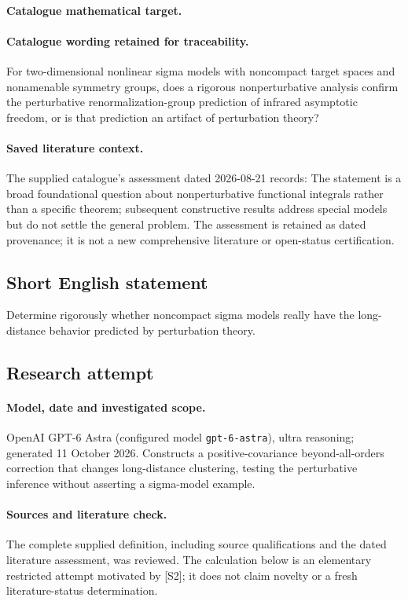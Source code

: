 \documentclass[11pt]{article}
\begin{document}
\paragraph{Catalogue mathematical target.}
\paragraph{Catalogue wording retained for traceability.}
For two-dimensional nonlinear sigma models with noncompact target spaces and nonamenable symmetry groups, does a rigorous nonperturbative analysis confirm the perturbative renormalization-group prediction of infrared asymptotic freedom, or is that prediction an artifact of perturbation theory?

\paragraph{Saved literature context.} The supplied catalogue's assessment dated 2026-08-21 records: The statement is a broad foundational question about nonperturbative functional integrals rather than a specific theorem; subsequent constructive results address special models but do not settle the general problem. The assessment is retained as dated provenance; it is not a new comprehensive literature or open-status certification.
\subsection{Short English statement}
Determine rigorously whether noncompact sigma models really have the long-distance behavior predicted by perturbation theory.
\subsection{Research attempt}
\paragraph{Model, date and investigated scope.}
OpenAI GPT-6 Astra (configured model \texttt{gpt-6-astra}), ultra reasoning; generated 11 October 2026. Constructs a positive-covariance beyond-all-orders correction that changes long-distance clustering, testing the perturbative inference without asserting a sigma-model example.

\paragraph{Sources and literature check.}
The complete supplied definition, including source qualifications and the dated literature assessment, was reviewed. The calculation below is an elementary restricted attempt motivated by [S2]; it does not claim novelty or a fresh literature-status determination.
\end{document}
